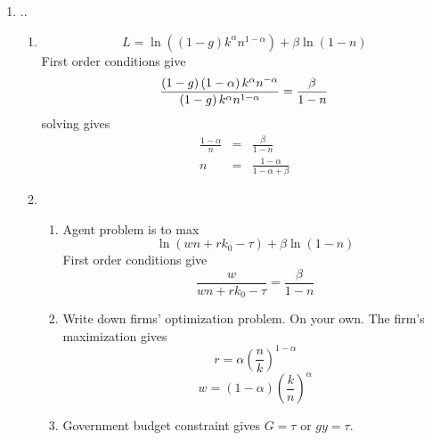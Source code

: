 \documentclass{article}
\begin{document}
\begin{enumerate}
\item ..

\begin{enumerate}
\item 
\begin{equation*}
L=\ln (\left( 1-g\right) k^{\alpha }n^{1-\alpha })+\beta \ln \left(
1-n\right)
\end{equation*}%
First order conditions give 
\begin{equation*}
\frac{\left( 1-g\right) \left( 1-\alpha \right) k^{\alpha }n^{-\alpha }}{%
\left( 1-g\right) k^{\alpha }n^{1-\alpha }}=\frac{\beta }{1-n}
\end{equation*}%
solving gives%
\begin{eqnarray*}
\frac{1-\alpha }{n} &=&\frac{\beta }{1-n} \\
n &=&\frac{1-\alpha }{1-\alpha +\beta }
\end{eqnarray*}

\item $\allowbreak $

\begin{enumerate}
\item Agent problem is to max%
\begin{equation*}
\ln \left( wn+rk_{0}-\tau \right) +\beta \ln \left( 1-n\right)
\end{equation*}%
First order conditions give%
\begin{equation*}
\frac{w}{wn+rk_{0}-\tau }=\frac{\beta }{1-n}
\end{equation*}

\item Write down firms' optimization problem. On your own. The firm's
maximization gives 
\begin{equation*}
r=\alpha \left( \frac{n}{k}\right) ^{1-\alpha }
\end{equation*}%
\begin{equation*}
w=\left( 1-\alpha \right) \left( \frac{k}{n}\right) ^{\alpha }
\end{equation*}

\item Government budget constraint gives $G=\tau $ or $gy=\tau .$


\end{enumerate}
\end{enumerate}
\end{enumerate}
\end{document}
